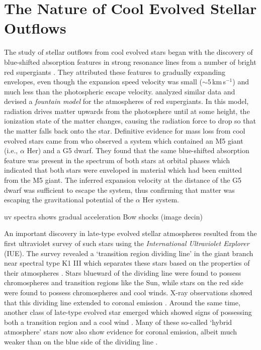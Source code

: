 \section{The Nature of Cool Evolved Stellar Outflows}\label{sec:2}
The study of stellar outflows from cool evolved stars began with the discovery of blue-shifted absorption features in strong resonance lines from a number of bright red supergiants \citep{adams_1935}. They attributed these features to gradually expanding envelopes, even though the expansion speed velocity was small ($\sim 5$\,km\,s$^{-1}$) and much less than the photospheric escape velocity. \cite{spitzer_1939} analyzed similar data and devised a \textit{fountain model} for the atmospheres of red supergiants. In this model, radiation drives matter upwards from the photosphere until at some height, the ionization state of the matter changes, causing the radiation force to drop so that the matter falls back onto the star. Definitive evidence for mass loss from cool evolved stars came from \cite{deutsch_1956} who observed a system which contained an M5 giant (i.e., $\alpha$ Her) and a G5 dwarf. They found that the same blue-shifted absorption feature was present in the spectrum of both stars at orbital phases which indicated that both stars were enveloped in material which had been emitted from the M5 giant. The inferred expansion velocity at the distance of the G5 dwarf was sufficient to escape the system, thus confirming that matter was escaping the gravitational potential of the $\alpha$ Her system.


uv spectra shows gradual acceleration
Bow shocks (image decin)

An important discovery in late-type evolved stellar atmospheres resulted from the first ultraviolet survey of such stars using the \textit{International Ultraviolet Explorer} (IUE). The survey revealed a `transition region dividing line' in the giant branch near spectral type K1 III which separates these stars based on the properties of their atmospheres \citep{linsky_1979}. Stars blueward of the dividing line were found to possess chromospheres and transition regions like the Sun, while stars on the red side were found to possess chromospheres and cool winds. X-ray observations showed that this dividing line extended to coronal emission \citep{ayres_1981}. Around the same time, another class of late-type evolved star emerged which showed signs of possessing both a transition region and a cool wind \citep[e.g.,][]{reimers_1982}. Many of these so-called `hybrid atmosphere' stars now also show evidence for coronal emission, albeit much weaker than on the blue side of the dividing line \citep{ayres_1997,dupree_2005}. 

